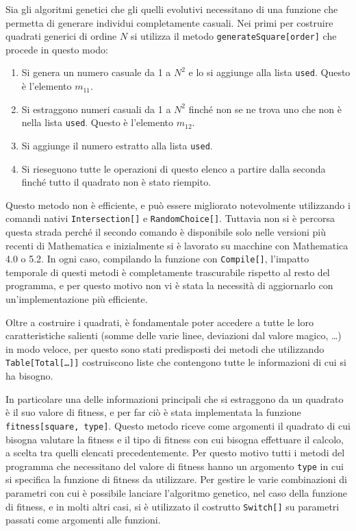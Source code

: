 \documentclass[italian,twoside,twocolumn]{article}
\begin{document}
Sia gli algoritmi genetici che gli quelli evolutivi necessitano di una funzione che permetta di generare individui completamente casuali. Nei primi per costruire quadrati generici di ordine $ N $ si utilizza il metodo \texttt{generateSquare[order]} che procede in questo modo: 
\begin{enumerate}
	\item Si genera un numero casuale da 1 a $ N^2 $ e lo si aggiunge alla lista \texttt{used}. Questo è l'elemento $ m_{11} $.
	\item Si estraggono numeri casuali da 1 a $ N^2 $ finché non se ne trova uno che non è nella lista \texttt{used}. Questo è l'elemento $ m_{12} $. 
	\item Si aggiunge il numero estratto alla lista \texttt{used}.
	\item Si rieseguono tutte le operazioni di questo elenco a partire dalla seconda finché tutto il quadrato non è stato riempito. 
\end{enumerate}
Questo metodo non è efficiente, e può essere migliorato notevolmente utilizzando i comandi nativi \texttt{Intersection[]} e \texttt{RandomChoice[]}. Tuttavia non si è percorsa questa strada perché il secondo comando è disponibile solo nelle versioni più recenti di Mathematica e inizialmente si è lavorato su macchine con Mathematica 4.0 o 5.2. In ogni caso, compilando la funzione con \texttt{Compile[]}, l'impatto temporale di questi metodi è completamente trascurabile rispetto al resto del programma, e per questo motivo non vi è stata la necessità di aggiornarlo con un'implementazione più efficiente.

Oltre a costruire i quadrati, è fondamentale poter accedere a tutte le loro caratteristiche salienti (somme delle varie linee, deviazioni dal valore magico, \dots) in modo veloce, per questo sono stati predisposti dei metodi che utilizzando \texttt{Table[Total[\dots]]} costruiscono liste che contengono tutte le informazioni di cui si ha bisogno.
	
In particolare una delle informazioni principali che si estraggono da un quadrato è il suo valore di fitness, e per far ciò è stata implementata la funzione \texttt{fitness[square, type]}. Questo metodo riceve come argomenti il quadrato di cui bisogna valutare la fitness e il tipo di fitness con cui bisogna effettuare il calcolo, a scelta tra quelli elencati precedentemente. Per questo motivo tutti i metodi del programma che necessitano del valore di fitness hanno un argomento \texttt{type} in cui si specifica la funzione di fitness da utilizzare. Per gestire le varie combinazioni di parametri con cui è possibile lanciare l'algoritmo genetico, nel caso della funzione di fitness, e in molti altri casi, si è utilizzato il costrutto \texttt{Switch[]} su parametri passati come argomenti alle funzioni. 
\end{document}
